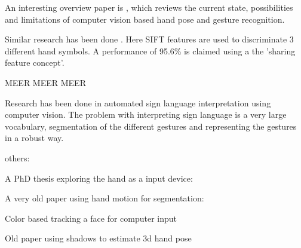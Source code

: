 An interesting overview paper is \cite{Erol2007}, which reviews the current state, possibilities and limitations of computer vision based hand pose and gesture recognition.


Similar research has been done \cite{Wang2007}. Here SIFT features are used to discriminate 3 different hand symbols. A performance of 95.6\% is claimed using a the 'sharing feature concept'.


MEER MEER MEER




Research has been done in automated sign language interpretation using computer vision\cite{Buehler2009}\cite{RichardBowden2004}. The problem with interpreting sign language is a very large vocabulary, segmentation of the different gestures and representing the gestures in a robust way.

others:

A PhD thesis exploring the hand as a input device: \cite{Sturman1992}

A very old paper using hand motion for segmentation: \cite{Cui1996}

Color based tracking a face for computer input \cite{Bradski1998}

Old paper using shadows to estimate 3d hand pose \cite{Segen1999}




